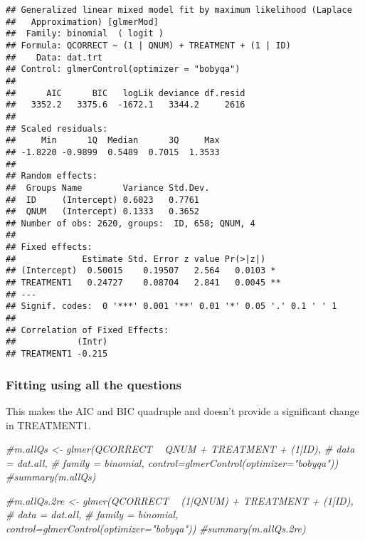 \documentclass[]{article}
\newenvironment{Shaded}{\begin{snugshade}}{\end{snugshade}}
\newcommand{\CommentTok}[1]{\textcolor[rgb]{0.56,0.35,0.01}{\textit{#1}}}
\begin{document}
\begin{verbatim}
## Generalized linear mixed model fit by maximum likelihood (Laplace
##   Approximation) [glmerMod]
##  Family: binomial  ( logit )
## Formula: QCORRECT ~ (1 | QNUM) + TREATMENT + (1 | ID)
##    Data: dat.trt
## Control: glmerControl(optimizer = "bobyqa")
## 
##      AIC      BIC   logLik deviance df.resid 
##   3352.2   3375.6  -1672.1   3344.2     2616 
## 
## Scaled residuals: 
##     Min      1Q  Median      3Q     Max 
## -1.8220 -0.9899  0.5489  0.7015  1.3533 
## 
## Random effects:
##  Groups Name        Variance Std.Dev.
##  ID     (Intercept) 0.6023   0.7761  
##  QNUM   (Intercept) 0.1333   0.3652  
## Number of obs: 2620, groups:  ID, 658; QNUM, 4
## 
## Fixed effects:
##             Estimate Std. Error z value Pr(>|z|)   
## (Intercept)  0.50015    0.19507   2.564   0.0103 * 
## TREATMENT1   0.24727    0.08704   2.841   0.0045 **
## ---
## Signif. codes:  0 '***' 0.001 '**' 0.01 '*' 0.05 '.' 0.1 ' ' 1
## 
## Correlation of Fixed Effects:
##            (Intr)
## TREATMENT1 -0.215
\end{verbatim}

\subsubsection{Fitting using all the
questions}\label{fitting-using-all-the-questions}

This makes the AIC and BIC quadruple and doesn't provide a significant
change in TREATMENT1.

\begin{Shaded}
\begin{Highlighting}[]
\CommentTok{#m.allQs <- glmer(QCORRECT ~ QNUM + TREATMENT + (1|ID), }
\CommentTok{#                data = dat.all, }
\CommentTok{#                family = binomial, control=glmerControl(optimizer="bobyqa"))}
\CommentTok{#summary(m.allQs)}
\end{Highlighting}
\end{Shaded}

\begin{Shaded}
\begin{Highlighting}[]
\CommentTok{#m.allQs.2re <- glmer(QCORRECT ~ (1|QNUM) + TREATMENT + (1|ID), }
\CommentTok{#                data = dat.all, }
\CommentTok{#                family = binomial, control=glmerControl(optimizer="bobyqa"))}
\CommentTok{#summary(m.allQs.2re)}
\end{Highlighting}
\end{Shaded}
\end{document}
